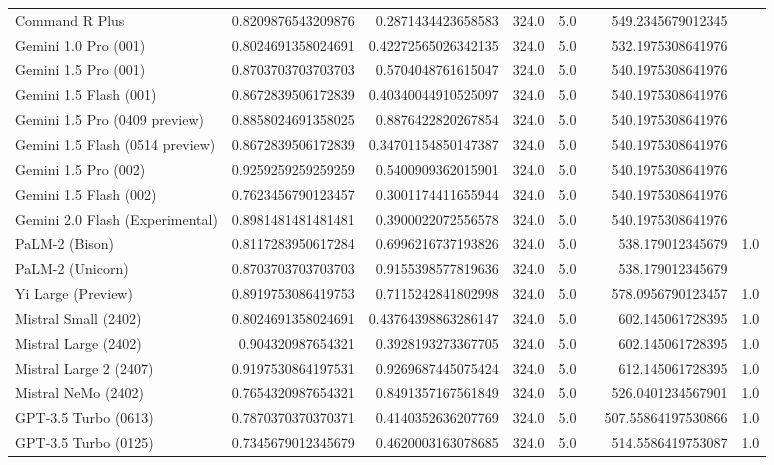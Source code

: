\begin{table}[htp]
{\begin{tabular}{lrrrrrrr}
Command R Plus & 0.8209876543209876 & 0.2871434423658583 & 324.0 & 5.0 &  & 549.2345679012345 &  \\
Gemini 1.0 Pro (001) & 0.8024691358024691 & 0.42272565026342135 & 324.0 & 5.0 &  & 532.1975308641976 &  \\
Gemini 1.5 Pro (001) & 0.8703703703703703 & 0.5704048761615047 & 324.0 & 5.0 &  & 540.1975308641976 &  \\
Gemini 1.5 Flash (001) & 0.8672839506172839 & 0.40340044910525097 & 324.0 & 5.0 &  & 540.1975308641976 &  \\
Gemini 1.5 Pro (0409 preview) & 0.8858024691358025 & 0.8876422820267854 & 324.0 & 5.0 &  & 540.1975308641976 &  \\
Gemini 1.5 Flash (0514 preview) & 0.8672839506172839 & 0.34701154850147387 & 324.0 & 5.0 &  & 540.1975308641976 &  \\
Gemini 1.5 Pro (002) & 0.9259259259259259 & 0.5400909362015901 & 324.0 & 5.0 &  & 540.1975308641976 &  \\
Gemini 1.5 Flash (002) & 0.7623456790123457 & 0.3001174411655944 & 324.0 & 5.0 &  & 540.1975308641976 &  \\
Gemini 2.0 Flash (Experimental) & 0.8981481481481481 & 0.3900022072556578 & 324.0 & 5.0 &  & 540.1975308641976 &  \\
PaLM-2 (Bison) & 0.8117283950617284 & 0.6996216737193826 & 324.0 & 5.0 &  & 538.179012345679 & 1.0 \\
PaLM-2 (Unicorn) & 0.8703703703703703 & 0.9155398577819636 & 324.0 & 5.0 &  & 538.179012345679 &  \\
Yi Large (Preview) & 0.8919753086419753 & 0.7115242841802998 & 324.0 & 5.0 &  & 578.0956790123457 & 1.0 \\
Mistral Small (2402) & 0.8024691358024691 & 0.43764398863286147 & 324.0 & 5.0 &  & 602.145061728395 & 1.0 \\
Mistral Large (2402) & 0.904320987654321 & 0.3928193273367705 & 324.0 & 5.0 &  & 602.145061728395 & 1.0 \\
Mistral Large 2 (2407) & 0.9197530864197531 & 0.9269687445075424 & 324.0 & 5.0 &  & 612.145061728395 & 1.0 \\
Mistral NeMo (2402) & 0.7654320987654321 & 0.8491357167561849 & 324.0 & 5.0 &  & 526.0401234567901 & 1.0 \\
GPT-3.5 Turbo (0613) & 0.7870370370370371 & 0.4140352636207769 & 324.0 & 5.0 &  & 507.55864197530866 & 1.0 \\
GPT-3.5 Turbo (0125) & 0.7345679012345679 & 0.4620003163078685 & 324.0 & 5.0 &  & 514.5586419753087 & 1.0 \\

\end{tabular}}
\end{table}
